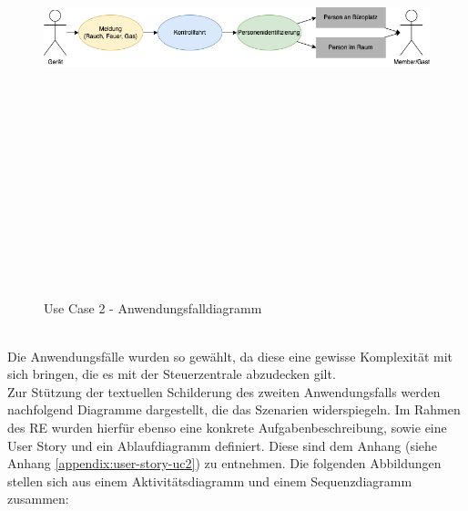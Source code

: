     \begin{figure}[hbt!]
        \centering
        \includegraphics[width=15cm,height=15cm,keepaspectratio]{images/UC2_Diagramm_Notfall.png}
        \caption{Use Case 2 - Anwendungsfalldiagramm}
        \label{fig:uc2-emergency}
    \end{figure}
    \\
    Die Anwendungsfälle wurden so gewählt, da diese eine gewisse Komplexität mit sich bringen, die es mit der Steuerzentrale 
    abzudecken gilt.
    \\
    \linebreak
    Zur Stützung der textuellen Schilderung des zweiten Anwendungsfalls werden nachfolgend Diagramme dargestellt, die das Szenarien 
    widerspiegeln. Im Rahmen des \acs{RE} wurden hierfür ebenso eine konkrete Aufgabenbeschreibung, sowie eine User Story und ein Ablaufdiagramm definiert. Diese sind dem 
    Anhang (siehe Anhang \ref{appendix:user-story-uc2}) zu entnehmen. Die folgenden Abbildungen stellen sich aus einem 
    Aktivitätsdiagramm und einem Sequenzdiagramm zusammen: %
    